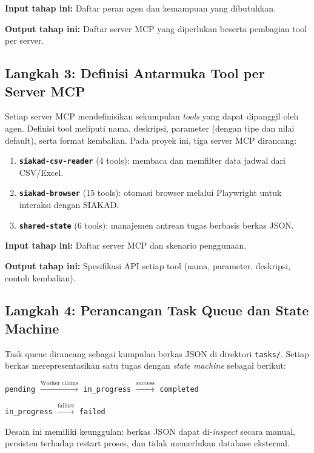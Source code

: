 \textbf{Input tahap ini:} Daftar peran agen dan kemampuan yang dibutuhkan.

\textbf{Output tahap ini:} Daftar server MCP yang diperlukan beserta pembagian tool per server.

\subsection{Langkah 3: Definisi Antarmuka Tool per Server MCP}

Setiap server MCP mendefinisikan sekumpulan \textit{tools} yang dapat dipanggil oleh agen. Definisi tool meliputi nama, deskripsi, parameter (dengan tipe dan nilai default), serta format kembalian. Pada proyek ini, tiga server MCP dirancang:
\begin{enumerate}
  \item \textbf{\texttt{siakad-csv-reader}} (4 tools): membaca dan memfilter data jadwal dari CSV/Excel.
  \item \textbf{\texttt{siakad-browser}} (15 tools): otomasi browser melalui Playwright untuk interaksi dengan SIAKAD.
  \item \textbf{\texttt{shared-state}} (6 tools): manajemen antrean tugas berbasis berkas JSON.
\end{enumerate}

\textbf{Input tahap ini:} Daftar server MCP dan skenario penggunaan.

\textbf{Output tahap ini:} Spesifikasi API setiap tool (nama, parameter, deskripsi, contoh kembalian).

\subsection[Langkah 4: Perancangan Task Queue]{Langkah 4: Perancangan Task Queue dan State Machine}

Task queue dirancang sebagai kumpulan berkas JSON di direktori \texttt{tasks/}. Setiap berkas merepresentasikan satu tugas dengan \textit{state machine} sebagai berikut:

\begin{center}
\texttt{pending} $\xrightarrow{\text{Worker claims}}$ \texttt{in\_progress} $\xrightarrow{\text{success}}$ \texttt{completed}
\end{center}
\begin{center}
\texttt{in\_progress} $\xrightarrow{\text{failure}}$ \texttt{failed}
\end{center}

Desain ini memiliki keunggulan: berkas JSON dapat di-\textit{inspect} secara manual, persisten terhadap restart proses, dan tidak memerlukan database eksternal.

